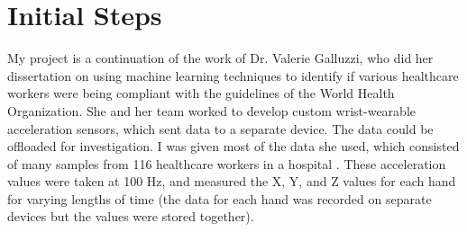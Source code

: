 \documentclass[]{report}
\begin{document}
\section{Initial Steps}

My project is a continuation of the work of Dr. Valerie Galluzzi, who did her dissertation on using machine learning techniques to identify if various healthcare workers were being compliant with the guidelines of the World Health Organization. She and her team worked to develop custom wrist-wearable acceleration sensors, which sent data to a separate device. The data could be offloaded for investigation. I was given most of the data she used, which consisted of many samples from 116 healthcare workers in a hospital \cite{Galluzzi}. These acceleration values were taken at 100 Hz, and measured the X, Y, and Z values for each hand for varying lengths of time (the data for each hand was recorded on separate devices but the values were stored together). 
\end{document}
